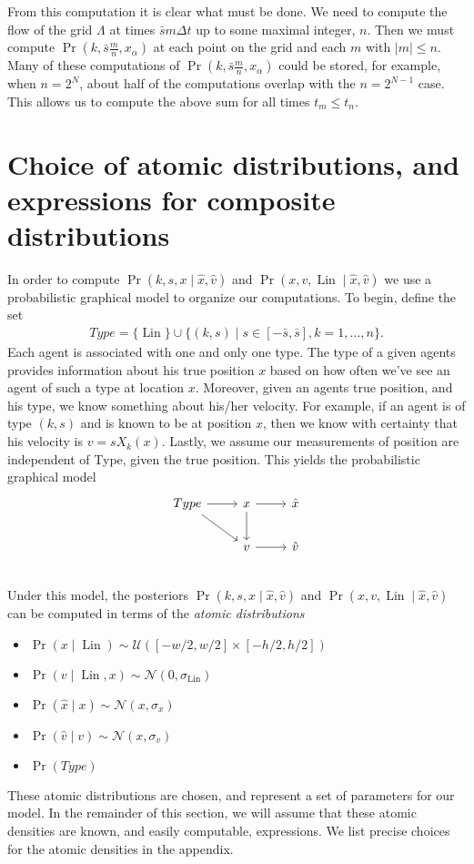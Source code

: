 \documentclass[12pt]{amsart}
\DeclareMathOperator{\Lin}{Lin}
\begin{document}
From this computation it is clear what must be done.
We need to compute the flow of the grid $\Lambda$ at times $\bar{s} m \Delta t$ up to some maximal integer, $n$.
Then we must compute $\Pr( k , \bar{s}\frac{m}{n} , x_\alpha)$ at each point on the grid and each $m$ with $|m| \leq n$.
Many of these computations of $\Pr(k,\bar{s} \frac{m}{n}, x_\alpha)$ could be stored, for example, when $n=2^{N}$, about half of the computations overlap with the $n=2^{N-1}$ case.
This allows us to compute the above sum for all times $t_m \leq t_n$.

\section{Choice of atomic distributions, and expressions for composite distributions}
In order to compute $\Pr( k,s,x \mid \hat{x}, \hat{v} )$ and $\Pr( x, v, \Lin \mid \hat{x}, \hat{v} )$ we use a probabilistic graphical model to organize our computations.
To begin, define the set
\begin{align*}
	Type = \{ \Lin \} \cup \{ (k,s) \mid s \in [-\bar{s}, \bar{s}] , k = 1,\dots,n\}.
\end{align*}
Each agent is associated with one and only one type.
The type of a given agents provides information about his true position $x$ based on how often we've see an agent of such a type at location $x$.
Moreover, given an agents true position, and his type, we know something about his/her velocity.
For example, if an agent is of type $(k,s)$ and is known to be at position $x$, then we know with certainty that his velocity is $v = sX_k(x)$.
Lastly, we assume our measurements of position are independent of Type, given the true position.
This yields the probabilistic graphical model
\begin{equation}
\begin{tikzcd}
	Type \arrow[r] \arrow[rd] & x \arrow[d] \arrow[r] & \hat{x} \\
	 & v \ar[r] & \hat{v} \\
\end{tikzcd}
\label{eq:pgm}
\end{equation}
Under this model, the posteriors $\Pr( k,s,x \mid \hat{x}, \hat{v} )$ and $\Pr( x, v, \Lin \mid \hat{x}, \hat{v} )$ can be computed in terms of the \emph{atomic distributions}
\begin{itemize}
	\item $\Pr( x \mid \Lin ) \sim \mathcal{U}( [-w/2,w/2] \times [-h/2, h/2] )$
	\item $\Pr( v \mid \Lin, x) \sim \mathcal{N}(0, \sigma_{\Lin} )$
	\item $\Pr( \hat{x} \mid x) \sim \mathcal{N}( x , \sigma_x)$
	\item $\Pr( \hat{v} \mid v) \sim \mathcal{N}( x , \sigma_v)$
	\item $\Pr(Type)$
\end{itemize}
These atomic distributions are chosen, and represent a set of parameters for our model.
In the remainder of this section, we will assume that these atomic densities are known, and easily computable, expressions.
We list precise choices for the atomic densities in the appendix.
\end{document}
